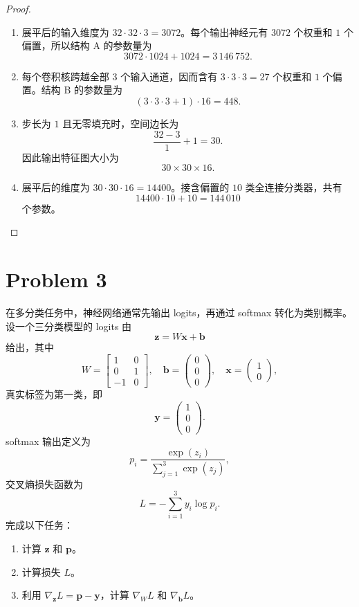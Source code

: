 \begin{proof}
    \begin{enumerate}
        \item 展平后的输入维度为 $32\cdot32\cdot3=3072$。每个输出神经元有 $3072$ 个权重和 $1$ 个偏置，所以结构 A 的参数量为
        \[
            3072\cdot1024+1024=\boxed{3\,146\,752}.
        \]
        \item 每个卷积核跨越全部 $3$ 个输入通道，因而含有 $3\cdot3\cdot3=27$ 个权重和 $1$ 个偏置。结构 B 的参数量为
        \[
            (3\cdot3\cdot3+1)\cdot16=\boxed{448}.
        \]
        \item 步长为 $1$ 且无零填充时，空间边长为
        \[
            \frac{32-3}{1}+1=30.
        \]
        因此输出特征图大小为
        \[
            \boxed{30\times30\times16}.
        \]
        \item 展平后的维度为 $30\cdot30\cdot16=14400$。接含偏置的 $10$ 类全连接分类器，共有
        \[
            14400\cdot10+10=\boxed{144\,010}
        \]
        个参数。
    \end{enumerate}
\end{proof}

\section*{Problem 3}

在多分类任务中，神经网络通常先输出 logits，再通过 softmax 转化为类别概率。设一个三分类模型的 logits 由
\[
\bm{z} = W \bm{x} + \bm{b}
\]
给出，其中
\[
W = \begin{bmatrix}
    1 & 0 \\
    0 & 1 \\
    -1 & 0
\end{bmatrix},\quad
\bm{b} = \begin{pmatrix} 0 \\ 0 \\ 0 \end{pmatrix},\quad
\bm{x} = \begin{pmatrix} 1 \\ 0 \end{pmatrix},
\]
真实标签为第一类，即
\[
\bm{y} = \begin{pmatrix} 1 \\ 0 \\ 0 \end{pmatrix}.
\]
softmax 输出定义为
\[
p_i = \frac{\exp(z_i)}{\sum_{j=1}^{3} \exp(z_j)},
\]
交叉熵损失函数为
\[
L = -\sum_{i=1}^{3} y_i \log p_i.
\]
完成以下任务：
\begin{enumerate}
    \item 计算 $\bm{z}$ 和 $\bm{p}$。
    \item 计算损失 $L$。
    \item 利用 $\nabla_{\bm{z}} L = \bm{p} - \bm{y}$，计算 $\nabla_W L$ 和 $\nabla_{\bm{b}} L$。
\end{enumerate}

